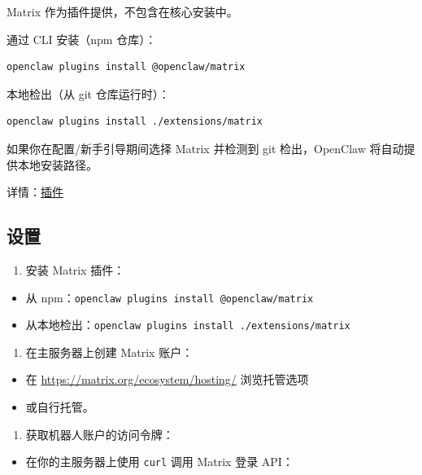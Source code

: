 Matrix 作为插件提供，不包含在核心安装中。

通过 CLI 安装（npm 仓库）：

\begin{lstlisting}[language=bash]
openclaw plugins install @openclaw/matrix
\end{lstlisting}


本地检出（从 git 仓库运行时）：

\begin{lstlisting}[language=bash]
openclaw plugins install ./extensions/matrix
\end{lstlisting}


如果你在配置/新手引导期间选择 Matrix 并检测到 git 检出，OpenClaw 将自动提供本地安装路径。

详情：\href{/tools/plugin}{插件}

\subsection{设置}


\begin{enumerate}
  \item 安装 Matrix 插件：
\end{enumerate}

\begin{itemize}
  \item 从 npm：\texttt{openclaw plugins install @openclaw/matrix}
  \item 从本地检出：\texttt{openclaw plugins install ./extensions/matrix}
\end{itemize}

\begin{enumerate}
  \item 在主服务器上创建 Matrix 账户：
\end{enumerate}

\begin{itemize}
  \item 在 \href{https://matrix.org/ecosystem/hosting/}{https://matrix.org/ecosystem/hosting/} 浏览托管选项
  \item 或自行托管。
\end{itemize}

\begin{enumerate}
  \item 获取机器人账户的访问令牌：
\end{enumerate}

\begin{itemize}
  \item 在你的主服务器上使用 \texttt{curl} 调用 Matrix 登录 API：
\end{itemize}


